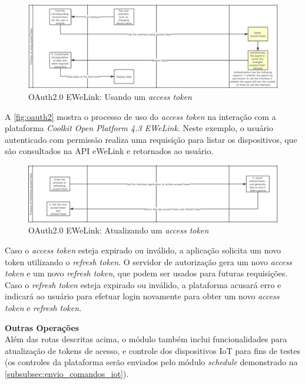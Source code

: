 \begin{figure}[htp]
	\caption{\label{fig:oauth2}OAuth2.0 EWeLink: Usando um \textit{access token}}
	\begin{center}
	  \includegraphics[scale=0.45]{images/cap5/oauth_2.png}
	\end{center}
\end{figure}

A \autoref{fig:oauth2} mostra o processo de uso do \textit{access token} na interação com a plataforma \textit{Coolkit Open Platform 4.3 EWeLink}. Neste exemplo, o usuário autenticado com permissão realiza uma requisição para listar os dispositivos, que são consultados na API eWeLink e retornados ao usuário.

\begin{figure}[htp]
	\caption{\label{fig:oauth3}OAuth2.0 EWeLink: Atualizando um \textit{access token}}
	\begin{center}
	  \includegraphics[scale=0.45]{images/cap5/oauth_3.png}
	\end{center}
\end{figure}

Caso o \textit{access token} esteja expirado ou inválido, a aplicação solicita um novo token utilizando o \textit{refresh token}. O servidor de autorização gera um novo \textit{access token} e um novo \textit{refresh token}, que podem ser usados para futuras requisições. Caso o \textit{refresh token} esteja expirado ou inválido, a plataforma acusará erro e indicará ao usuário para efetuar login novamente para obter um novo \textit{access token} e \textit{refresh token}.
 
\noindent\textbf{Outras Operações}\\
Além das rotas descritas acima, o módulo também inclui funcionalidades para atualização de tokens de acesso, e controle dos dispositivos IoT para fins de testes (os controles da plataforma serão enviados pelo módulo \textit{schedule} demonstrado na \autoref{subsubsec:envio_comandos_iot}).

